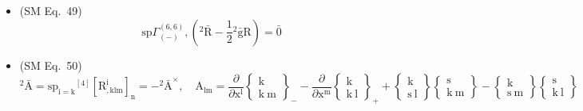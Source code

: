 \documentclass[12pt]{article}
\begin{document}
\begin{itemize}[label={},leftmargin=0pt]
    \item (SM Eq.\ 49) 
    \[
    \mathrm{sp} \Gamma^{(6,6)}_{(-)}, \left( {}^2\bar{\mathrm{R}} - \frac{1}{2}{}^2\bar{\mathrm{g}}\mathrm{R} \right) = \bar{0}
    \]

    \item (SM Eq.\ 50) 
    \[
    {}^2\bar{\mathrm{A}} = \mathrm{sp}_{\mathrm{i=k}} {}^{[4]}\left[ \mathrm{R}^\mathrm{i}_{\mathrm{,klm}} \right]_\mathrm{n} = -{}^2\bar{\mathrm{A}}^\times, \quad \mathrm{A}_{\mathrm{lm}} = \frac{\partial}{\partial \mathrm{x^l}}\left\{ \begin{smallmatrix} \mathrm{k} \\ \mathrm{k\ m} \end{smallmatrix} \right\}_- - \frac{\partial}{\partial \mathrm{x^m}}\left\{ \begin{smallmatrix} \mathrm{k} \\ \mathrm{k\ l} \end{smallmatrix} \right\}_+ + \left\{ \begin{smallmatrix} \mathrm{k} \\ \mathrm{s\ l} \end{smallmatrix} \right\}\left\{ \begin{smallmatrix} \mathrm{s} \\ \mathrm{k\ m} \end{smallmatrix} \right\} - \left\{ \begin{smallmatrix} \mathrm{k} \\ \mathrm{s\ m} \end{smallmatrix} \right\}\left\{ \begin{smallmatrix} \mathrm{s} \\ \mathrm{k\ l} \end{smallmatrix} \right\}
    \]


\end{itemize}
\end{document}
